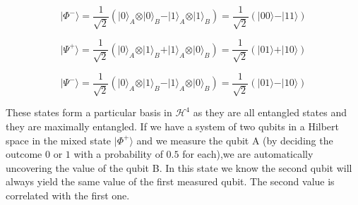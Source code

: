 \begin{equation}
\vert\Phi^{-}\rangle=\frac{1}{\sqrt{2}}(\vert0\rangle_{A} \otimes\vert0\rangle_{B} -\vert1\rangle_{A} \otimes\vert1\rangle_{B})=\frac{1}{\sqrt{2}}(\vert00\rangle-\vert11\rangle)
\end{equation}

\begin{equation}
\vert\Psi^{+}\rangle=\frac{1}{\sqrt{2}}(\vert0\rangle_{A} \otimes\vert1\rangle_{B} +\vert1\rangle_{A}\otimes\vert0\rangle_{B})=\frac{1}{\sqrt{2}}(\vert01\rangle+\vert10\rangle)
\end{equation}

\begin{equation}
\vert\Psi^{-}\rangle=\frac{1}{\sqrt{2}}(\vert0\rangle_{A} \otimes\vert1\rangle_{B} -\vert1\rangle_{A} \otimes\vert0\rangle_{B})=\frac{1}{\sqrt{2}}(\vert01\rangle-\vert10\rangle)
\end{equation}

These states form a particular basis in $\mathcal{H}^4$ as they are all entangled states and they are maximally entangled. If we have a system of two qubits in a Hilbert space in the mixed state $\vert\Phi^{+}\rangle$ and we measure the qubit A (by deciding the outcome $0$ or $1$ with a probability of $0.5$ for each),we are automatically uncovering the value of the qubit B. In this state we know the second qubit will always yield the same value of the first measured qubit. The second value is correlated with the first one.




